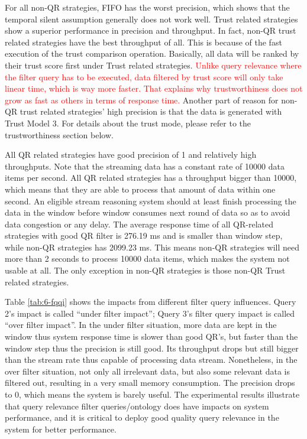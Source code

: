 For all non-QR strategies, FIFO has the worst precision, which shows that the temporal silent assumption generally does not work well.
Trust related strategies show a superior performance in precision and throughput. 
In fact, non-QR trust related strategies have the best throughput of all.
This is because of the fast execution of the trust comparison operation.
Basically, all data will be ranked by their trust score first under Trust related strategies. 
\textcolor{red}{
Unlike query relevance where the filter query has to be executed, data filtered by trust score will only take linear time, which is way more faster.
That explains why trustworthiness does not grow as fast as others in terms of response time.
}
Another part of reason for non-QR trust related strategies' high precision is that the data is generated with Trust Model 3. 
For details about the trust mode, please refer to the trustworthiness section below. 

All QR related strategies have good precision of 1 and relatively high throughputs. 
Note that the streaming data has a constant rate of 10000 data items per second. 
All QR related strategies has a throughput bigger than 10000, which means that they are able to process that amount of data within one second.
An eligible stream reasoning system should at least finish processing the data in the window before window consumes next round of data so as to avoid data congestion or any delay. 
The average response time of all QR-related strategies with good QR filter is 276.19 ms and is smaller than window step, while non-QR strategies has 2099.23 ms. 
This means non-QR strategies will need more than 2 seconds to process 10000 data items, which makes the system not usable at all. 
The only exception in non-QR strategies is those non-QR Trust related strategies. 

Table \ref{tab:6-fqqi} shows the impacts from different filter query influences. 
Query 2's impact is called ``under filter impact''; Query 3's filter query impact is called ``over filter impact''.
In the under filter situation, more data are kept in the window thus system response time is slower than good QR's, but faster than the window step thus the precision is still good.
Its throughput drops but still bigger than the stream rate thus capable of processing data stream. 
Nonetheless, in the over filter situation, not only all irrelevant data, but also some relevant data is filtered out, resulting in a very small memory consumption. 
The precision drops to 0, which means the system is barely useful.
The experimental results illustrate that query relevance filter queries/ontology does have impacts on system performance, and it is critical to deploy good quality query relevance in the system for better performance. 
%
